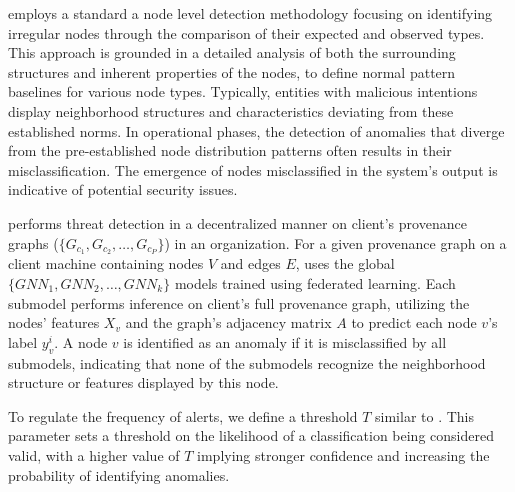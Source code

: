 \Sys employs a standard a node level detection methodology focusing on identifying irregular nodes through the comparison of their expected and observed types. This approach is grounded in a detailed analysis of both the surrounding structures and inherent properties of the nodes, to define normal pattern baselines for various node types. Typically, entities with malicious intentions display neighborhood structures and characteristics deviating from these established norms. In operational phases, the detection of anomalies that diverge from the pre-established node distribution patterns often results in their misclassification. The emergence of nodes misclassified in the system's output is indicative of potential security issues.

\Sys performs threat detection in a decentralized manner on client's provenance graphs (\( \{G_{c_1}, G_{c_2}, \ldots, G_{c_P}\} \)) in an organization. For a given provenance graph on a client machine containing nodes \(V\) and edges \(E\), \Sys uses the global \(\{GNN_1, GNN_2, \ldots, GNN_k\}\) \gnnshort models trained using federated learning. Each submodel performs inference on client's full provenance graph, utilizing the nodes' features \(X_v\) and the graph's adjacency matrix \(A\) to predict each node \(v\)'s label \(y_v^i\). A node \(v\) is identified as an anomaly if it is misclassified by all submodels, indicating that none of the submodels recognize the neighborhood structure or features displayed by this node. 

To regulate the frequency of alerts, we define a threshold \(T\) similar to \flash. This parameter sets a threshold on the likelihood of a classification being considered valid, with a higher value of \(T\) implying stronger confidence and increasing the probability of identifying anomalies. 